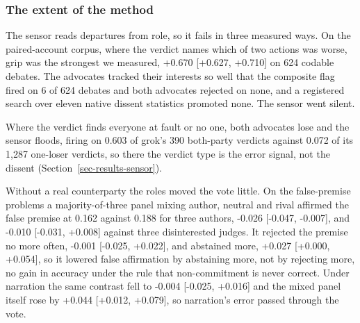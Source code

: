 \subsubsection{The extent of the method}
\label{sec-results-extent}

The sensor reads departures from role, so it fails in three measured ways. On
the paired-account corpus, where the verdict names which of two actions was
worse, grip was the strongest we measured, +0.670 [+0.627, +0.710] on
624 codable debates.
The advocates tracked their interests so well that the composite flag fired
on 6 of 624 debates and both advocates rejected on none,
and a registered search over eleven native dissent statistics promoted
none.
The sensor went silent.

Where the verdict finds everyone at fault or no one, both advocates lose and
the sensor floods, firing on 0.603 of grok's 390 both-party verdicts
against 0.072 of its 1,287 one-loser verdicts, so there the verdict type
is the error signal, not the dissent (Section~\ref{sec-results-sensor}).

Without a real counterparty the roles moved the vote little. On the
false-premise problems a majority-of-three panel mixing author, neutral and
rival affirmed the false premise at 0.162 against 0.188 for three
authors, -0.026 [-0.047, -0.007], and -0.010 [-0.031, +0.008] against
three disinterested judges.
It rejected the premise no more often, -0.001 [-0.025, +0.022], and
abstained more, +0.027 [+0.000, +0.054], so it lowered false affirmation
by abstaining more, not by rejecting more, no gain in accuracy under the
rule that non-commitment is never correct.
Under narration the same contrast fell to -0.004 [-0.025, +0.016] and the
mixed panel itself rose by +0.044 [+0.012, +0.079], so narration's error
passed through the vote.

